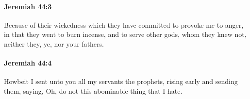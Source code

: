 		\paragraph{Jeremiah 44:3} %
			\label{JEREMIAH-44-3}

			Because of their wickedness which they have committed to provoke me to anger, in that they went to burn incense, and to serve other gods, whom they knew not, neither they, ye, nor your fathers.


		\paragraph{Jeremiah 44:4} %
			\label{JEREMIAH-44-4}

			Howbeit I sent unto you all my servants the prophets, rising early and sending them, saying, Oh, do not this abominable thing that I hate.


